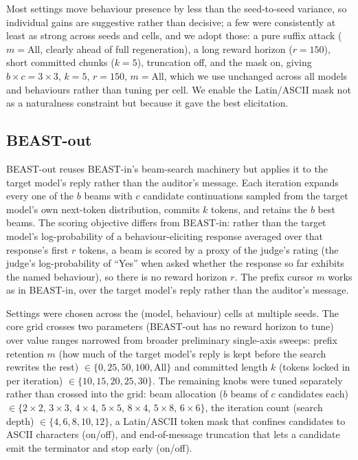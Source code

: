 \documentclass{article}
\theoremstyle{plain}
\theoremstyle{definition}
\theoremstyle{remark}
\begin{document}
Most settings move behaviour presence by less than the seed-to-seed variance, so individual gains are suggestive rather than decisive; a few were consistently at least as strong across seeds and cells, and we adopt those: a pure suffix attack ($m = \text{All}$, clearly ahead of full regeneration), a long reward horizon ($r = 150$), short committed chunks ($k = 5$), truncation off, and the mask on, giving $b \times c = 3 \times 3$, $k = 5$, $r = 150$, $m = \text{All}$, which we use unchanged across all models and behaviours rather than tuning per cell. We enable the Latin/ASCII mask not as a naturalness constraint but because it gave the best elicitation.

\subsection{BEAST-out}
BEAST-out reuses BEAST-in's beam-search machinery but applies it to the target model's reply rather than the auditor's message. Each iteration expands every one of the $b$ beams with $c$ candidate continuations sampled from the target model's own next-token distribution, commits $k$ tokens, and retains the $b$ best beams. The scoring objective differs from BEAST-in: rather than the target model's log-probability of a behaviour-eliciting response averaged over that response's first $r$ tokens, a beam is scored by a proxy of the judge's rating (the judge's log-probability of ``Yes'' when asked whether the response so far exhibits the named behaviour), so there is no reward horizon $r$. The prefix cursor $m$ works as in BEAST-in, over the target model's reply rather than the auditor's message.

Settings were chosen across the (model, behaviour) cells at multiple seeds. The core grid crosses two parameters (BEAST-out has no reward horizon to tune) over value ranges narrowed from broader preliminary single-axis sweeps: prefix retention $m$ (how much of the target model's reply is kept before the search rewrites the rest) $\in \{0, 25, 50, 100, \text{All}\}$ and committed length $k$ (tokens locked in per iteration) $\in \{10, 15, 20, 25, 30\}$. The remaining knobs were tuned separately rather than crossed into the grid: beam allocation ($b$ beams of $c$ candidates each) $\in \{2\times2,\,3\times3,\,4\times4,\,5\times5,\,8\times4,\,5\times8,\,6\times6\}$, the iteration count (search depth) $\in \{4, 6, 8, 10, 12\}$, a Latin/ASCII token mask that confines candidates to ASCII characters (on/off), and end-of-message truncation that lets a candidate emit the terminator and stop early (on/off).
\end{document}
